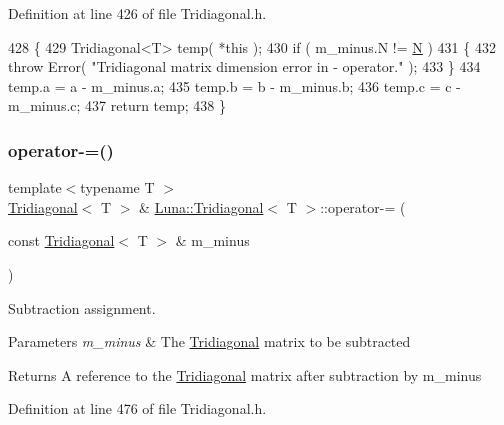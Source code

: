 Definition at line 426 of file Tridiagonal.\+h.


\begin{DoxyCode}
428   \{
429     Tridiagonal<T> temp( *\textcolor{keyword}{this} );
430     \textcolor{keywordflow}{if} ( m\_minus.N != \hyperlink{namespaceHeat__plot_a7d050092798e28458a263710837bda77}{N} )
431     \{
432       \textcolor{keywordflow}{throw} Error( \textcolor{stringliteral}{"Tridiagonal matrix dimension error in - operator."} );
433     \}
434     temp.a = a - m\_minus.a;
435     temp.b = b - m\_minus.b;
436     temp.c = c - m\_minus.c;
437     \textcolor{keywordflow}{return} temp;
438   \}
\end{DoxyCode}
\mbox{\label{classLuna_1_1Tridiagonal_ae4371d0bd7267737984ab697968f9eac}} 
\subsubsection{\texorpdfstring{operator-\/=()}{operator-=()}\hspace{0.1cm}{\footnotesize\ttfamily [1/2]}}
{\footnotesize\ttfamily template$<$typename T $>$ \\
\hyperlink{classLuna_1_1Tridiagonal}{Tridiagonal}$<$ T $>$ \& \hyperlink{classLuna_1_1Tridiagonal}{Luna\+::\+Tridiagonal}$<$ T $>$\+::operator-\/= (\begin{DoxyParamCaption}\item[{const \hyperlink{classLuna_1_1Tridiagonal}{Tridiagonal}$<$ T $>$ \&}]{m\+\_\+minus }\end{DoxyParamCaption})\hspace{0.3cm}{\ttfamily [inline]}}



Subtraction assignment. 


\begin{DoxyParams}{Parameters}
{\em m\+\_\+minus} & The \hyperlink{classLuna_1_1Tridiagonal}{Tridiagonal} matrix to be subtracted \\
\hline
\end{DoxyParams}
\begin{DoxyReturn}{Returns}
A reference to the \hyperlink{classLuna_1_1Tridiagonal}{Tridiagonal} matrix after subtraction by m\+\_\+minus 
\end{DoxyReturn}


Definition at line 476 of file Tridiagonal.\+h.


